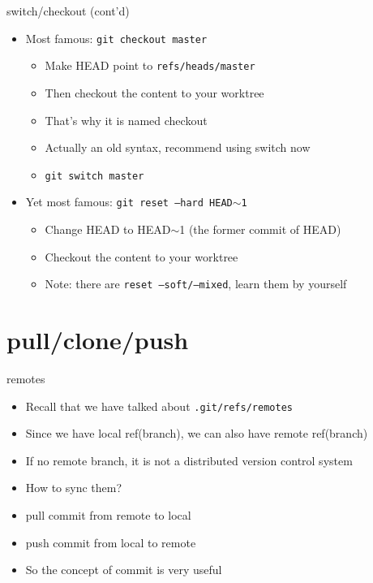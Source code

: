 \documentclass[aspectratio=169]{beamer}
\newcommand{\T}[1]{\texttt{#1}}
\begin{document}
\begin{frame}{switch/checkout (cont'd)}
  \begin{itemize}
    \item<1-> Most famous: \T{git checkout master}\begin{itemize}
      \item Make HEAD point to \T{refs/heads/master}
      \item Then checkout the content to your worktree
      \item That's why it is named checkout
      \item Actually an old syntax, recommend using switch now
      \item \T{git switch master}
    \end{itemize}
    \item<2-> Yet most famous: \T{git reset --hard HEAD$\sim$1}\begin{itemize}
      \item Change HEAD to HEAD$\sim$1 (the former commit of HEAD)
      \item Checkout the content to your worktree
      \item Note: there are \T{reset --soft/--mixed}, learn them by yourself
    \end{itemize}
  \end{itemize}
\end{frame}

\section{pull/clone/push}
\begin{frame}{remotes}
  \begin{itemize}
    \item Recall that we have talked about \T{.git/refs/remotes}
    \item Since we have local ref(branch), we can also have remote ref(branch)
    \item If no remote branch, it is not a distributed version control system
    \item How to sync them?
    \item pull commit from remote to local
    \item push commit from local to remote
    \item So the concept of commit is very useful
  \end{itemize}
\end{frame}
\end{document}
